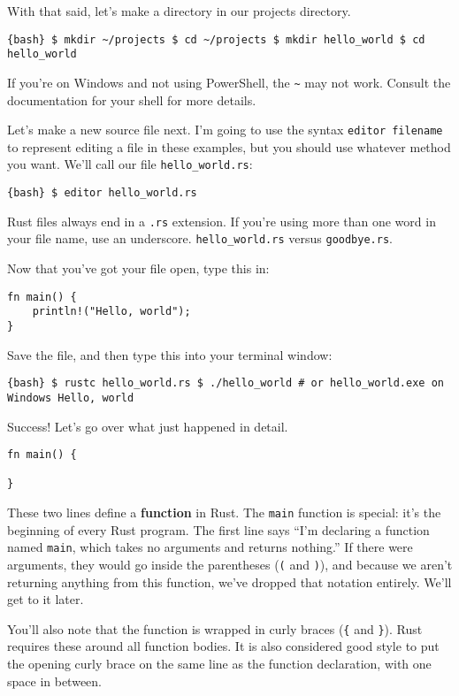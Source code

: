 \documentclass[]{article}
\begin{document}
With that said, let's make a directory in our projects directory.

\texttt{\{bash\} \$ mkdir \textasciitilde{}/projects \$ cd \textasciitilde{}/projects \$ mkdir hello\_world \$ cd hello\_world}

If you're on Windows and not using PowerShell, the
\texttt{\textasciitilde{}} may not work. Consult the documentation for
your shell for more details.

Let's make a new source file next. I'm going to use the syntax
\texttt{editor filename} to represent editing a file in these examples,
but you should use whatever method you want. We'll call our file
\texttt{hello\_world.rs}:

\texttt{\{bash\} \$ editor hello\_world.rs}

Rust files always end in a \texttt{.rs} extension. If you're using more
than one word in your file name, use an underscore.
\texttt{hello\_world.rs} versus \texttt{goodbye.rs}.

Now that you've got your file open, type this in:

\begin{verbatim}
fn main() {
    println!("Hello, world");
}
\end{verbatim}

Save the file, and then type this into your terminal window:

\texttt{\{bash\} \$ rustc hello\_world.rs \$ ./hello\_world \# or hello\_world.exe on Windows Hello, world}

Success! Let's go over what just happened in detail.

\begin{verbatim}
fn main() {

}
\end{verbatim}

These two lines define a \textbf{function} in Rust. The \texttt{main}
function is special: it's the beginning of every Rust program. The first
line says ``I'm declaring a function named \texttt{main}, which takes no
arguments and returns nothing.'' If there were arguments, they would go
inside the parentheses (\texttt{(} and \texttt{)}), and because we
aren't returning anything from this function, we've dropped that
notation entirely. We'll get to it later.

You'll also note that the function is wrapped in curly braces
(\texttt{\{} and \texttt{\}}). Rust requires these around all function
bodies. It is also considered good style to put the opening curly brace
on the same line as the function declaration, with one space in between.
\end{document}
